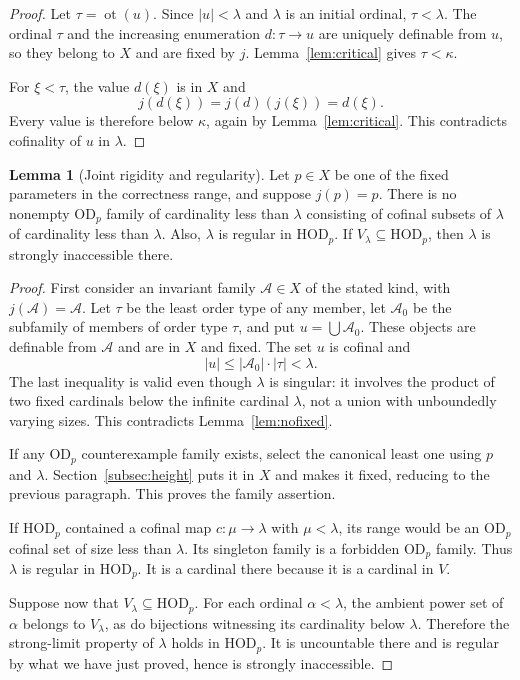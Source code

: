 \documentclass[11pt,letterpaper]{article}
\theoremstyle{definition}
\newtheorem{lemma}[definition]{Lemma}
\numberwithin{equation}{section}
\newcommand{\HOD}{\mathrm{HOD}}
\newcommand{\OD}{\mathrm{OD}}
\newcommand{\ot}{\operatorname{ot}}
\begin{document}
\begin{proof}
Let $\tau=\ot(u)$. Since $|u|<\lambda$ and $\lambda$ is an initial ordinal, $\tau<\lambda$. The ordinal $\tau$ and the increasing enumeration $d:\tau\to u$ are uniquely definable from $u$, so they belong to $X$ and are fixed by $j$. Lemma~\ref{lem:critical} gives $\tau<\kappa$.

For $\xi<\tau$, the value $d(\xi)$ is in $X$ and
\[
j(d(\xi))=j(d)(j(\xi))=d(\xi).
\]
Every value is therefore below $\kappa$, again by Lemma~\ref{lem:critical}. This contradicts cofinality of $u$ in $\lambda$.
\end{proof}

\begin{lemma}[Joint rigidity and regularity]\label{lem:regular}
Let $p\in X$ be one of the fixed parameters in the correctness range, and suppose $j(p)=p$. There is no nonempty $\OD_p$ family of cardinality less than $\lambda$ consisting of cofinal subsets of $\lambda$ of cardinality less than $\lambda$. Also, $\lambda$ is regular in $\HOD_p$. If $V_\lambda\subseteq\HOD_p$, then $\lambda$ is strongly inaccessible there.
\end{lemma}

\begin{proof}
First consider an invariant family $\mathcal A\in X$ of the stated kind, with $j(\mathcal A)=\mathcal A$. Let $\tau$ be the least order type of any member, let $\mathcal A_0$ be the subfamily of members of order type $\tau$, and put $u=\bigcup\mathcal A_0$. These objects are definable from $\mathcal A$ and are in $X$ and fixed. The set $u$ is cofinal and
\[
|u|\leq|\mathcal A_0|\cdot|\tau|<\lambda.
\]
The last inequality is valid even though $\lambda$ is singular: it involves the product of two fixed cardinals below the infinite cardinal $\lambda$, not a union with unboundedly varying sizes. This contradicts Lemma~\ref{lem:nofixed}.

If any $\OD_p$ counterexample family exists, select the canonical least one using $p$ and $\lambda$. Section~\ref{subsec:height} puts it in $X$ and makes it fixed, reducing to the previous paragraph. This proves the family assertion.

If $\HOD_p$ contained a cofinal map $c:\mu\to\lambda$ with $\mu<\lambda$, its range would be an $\OD_p$ cofinal set of size less than $\lambda$. Its singleton family is a forbidden $\OD_p$ family. Thus $\lambda$ is regular in $\HOD_p$. It is a cardinal there because it is a cardinal in $V$.

Suppose now that $V_\lambda\subseteq\HOD_p$. For each ordinal $\alpha<\lambda$, the ambient power set of $\alpha$ belongs to $V_\lambda$, as do bijections witnessing its cardinality below $\lambda$. Therefore the strong-limit property of $\lambda$ holds in $\HOD_p$. It is uncountable there and is regular by what we have just proved, hence is strongly inaccessible.
\end{proof}
\end{document}

